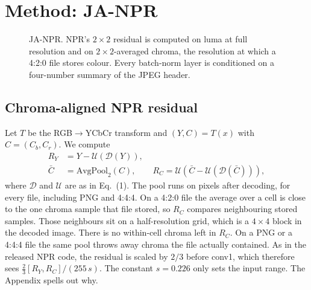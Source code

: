 \documentclass[conference]{IEEEtran}
\newcommand{\up}{\mathcal{U}}
\newcommand{\dn}{\mathcal{D}}
\begin{document}
\section{Method: JA-NPR}
\begin{figure}[t]
\centering
{}
\caption{JA-NPR. NPR's $2{\times}2$ residual is computed on luma at full resolution and on
$2{\times}2$-averaged chroma, the resolution at which a 4:2:0 file stores colour. Every batch-norm
layer is conditioned on a four-number summary of the JPEG header.}
\label{fig:method}
\end{figure}

\subsection{Chroma-aligned NPR residual}
Let $T$ be the RGB$\rightarrow$YCbCr transform and $(Y,C)=T(x)$ with $C=(C_b,C_r)$. We compute
\begin{align}
R_Y &= Y - \up(\dn(Y)),\\
\bar C &= \mathrm{AvgPool}_{2}(C), \qquad R_C = \up\!\left(\bar C - \up(\dn(\bar C))\right),
\end{align}
where $\dn$ and $\up$ are as in Eq.~(1). The pool runs on pixels after decoding, for every file, including PNG and 4:4:4. On a 4:2:0 file the average over a cell is close to the one chroma sample that file stored, so $R_C$ compares neighbouring stored samples. Those neighbours sit on a half-resolution grid, which is a $4{\times}4$ block in the decoded image. There is no within-cell chroma left in $R_C$. On a PNG or a 4:4:4 file the same pool throws away chroma the file actually contained. As in the released NPR code, the residual is scaled by $2/3$ before conv1, which therefore sees $\tfrac{2}{3}[R_Y, R_C]/(255\,s)$. The constant $s{=}0.226$ only sets the input range. The Appendix spells out why.
\end{document}
